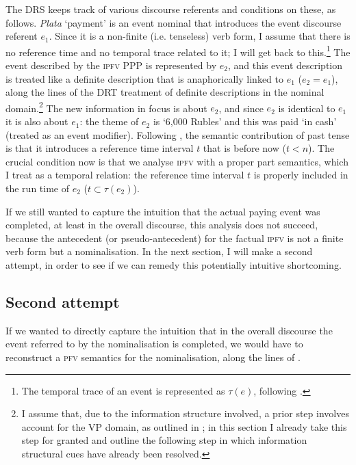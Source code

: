\documentclass[output=paper]{langscibook}
\begin{document}
\noindent The DRS keeps track of various discourse referents and conditions on these, as follows. \textit{Plata} `payment' is an event nominal that introduces the event discourse referent $e_1$. Since it is a non-finite (i.e. tenseless) verb form, I assume that there is no reference time and no temporal trace related to it; I will get back to this.\footnote{The temporal trace of an event is represented as $\tau(e)$, following \citet{krifka98}.} The event described by the \textsc{ipfv} PPP is represented by $e_2$, and this event description is treated like a definite description that is anaphorically linked to $e_1$ ($e_2 = e_1$), along the lines of the DRT treatment of definite descriptions in the nominal domain.\footnote{I assume that, due to the information structure involved, a prior step involves  account for the VP domain, as outlined in ; in this section I already take this step for granted and outline the following step in which information structural cues have already been resolved.} The new information in focus is about $e_2$, and since $e_2$ is identical to $e_1$ it is also about $e_1$: the theme of $e_2$ is `6,000 Rubles' and this was paid `in cash' (treated as an event modifier). Following \citet{kampreyle}, the semantic contribution of past tense is that it introduces  a reference time interval $t$ that is before now ($t < n$). The crucial condition now is that we analyse \textsc{ipfv} with a proper part semantics, which I treat as a temporal relation: the reference time interval $t$ is properly included in the run time of $e_2$ ($t \subset \tau(e_2)$).

If we still wanted to capture the intuition that the actual paying event was completed, at least in the overall discourse, this analysis does not succeed, because the antecedent (or pseudo-antecedent) for the factual \textsc{ipfv} is not a finite verb form but a nominalisation. In the next section, I will make a second attempt, in order to see if we can remedy this potentially intuitive shortcoming.  

\subsection{Second attempt}

If we wanted to directly capture the intuition that in the overall discourse the event referred to by the nominalisation is completed, we would have to reconstruct a \textsc{pfv} semantics for the nominalisation, along the lines of .  
\end{document}
